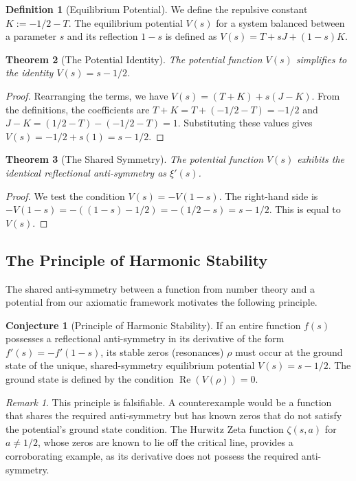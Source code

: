 \documentclass{amsart}
\theoremstyle{plain}
\newtheorem{theorem}{Theorem}[section]
\theoremstyle{definition}
\newtheorem{definition}[theorem]{Definition}
\newtheorem{conjecture}{Conjecture}
\theoremstyle{remark}
\newtheorem*{remark}{Remark}
\DeclareMathOperator{\re}{Re}
\begin{document}
\begin{definition}[Equilibrium Potential]
We define the repulsive constant $K := -1/2 - T$. The equilibrium potential $V(s)$ for a system balanced between a parameter $s$ and its reflection $1-s$ is defined as $V(s) = T + sJ + (1-s)K$.
\end{definition}

\begin{theorem}[The Potential Identity]
\label{thm:potential_id}
The potential function $V(s)$ simplifies to the identity $V(s) = s - 1/2$.
\end{theorem}
\begin{proof}
Rearranging the terms, we have $V(s) = (T+K) + s(J-K)$. From the definitions, the coefficients are $T+K = T + (-1/2 - T) = -1/2$ and $J-K = (1/2 - T) - (-1/2-T) = 1$. Substituting these values gives $V(s) = -1/2 + s(1) = s - 1/2$.
\end{proof}

\begin{theorem}[The Shared Symmetry]
The potential function $V(s)$ exhibits the identical reflectional anti-symmetry as $\xi'(s)$.
\end{theorem}
\begin{proof}
We test the condition $V(s) = -V(1-s)$. The right-hand side is $-V(1-s) = -((1-s) - 1/2) = -(1/2 - s) = s - 1/2$. This is equal to $V(s)$.
\end{proof}

\subsection{The Principle of Harmonic Stability}
The shared anti-symmetry between a function from number theory and a potential from our axiomatic framework motivates the following principle.
\begin{conjecture}[Principle of Harmonic Stability]
\label{conj:stability}
If an entire function $f(s)$ possesses a reflectional anti-symmetry in its derivative of the form $f'(s)=-f'(1-s)$, its stable zeros (resonances) $\rho$ must occur at the ground state of the unique, shared-symmetry equilibrium potential $V(s)=s-1/2$. The ground state is defined by the condition $\re(V(\rho))=0$.
\end{conjecture}
\begin{remark}
This principle is falsifiable. A counterexample would be a function that shares the required anti-symmetry but has known zeros that do not satisfy the potential's ground state condition. The Hurwitz Zeta function $\zeta(s, a)$ for $a \neq 1/2$, whose zeros are known to lie off the critical line, provides a corroborating example, as its derivative does not possess the required anti-symmetry.
\end{remark}
\end{document}
